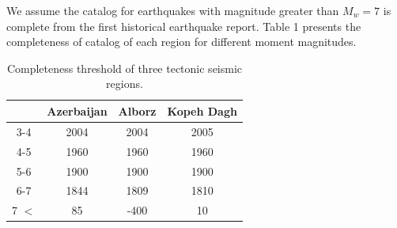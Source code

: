 We assume the catalog for earthquakes with magnitude greater than $M_w=7$ is complete from the first historical earthquake report. Table 1 presents the completeness of catalog of each region for different moment magnitudes.

\begin{table}[h]
\centering
\caption{Completeness threshold of three tectonic seismic regions.}
\begin{tabular}{cccc}
 ~           & Azerbaijan & Alborz & Kopeh Dagh \\ \hline
3-4         & 2004       & 2004   & 2005       \\ \hline
4-5         & 1960       & 1960   & 1960       \\ \hline
5-6         & 1900       & 1900   & 1900       \\ \hline
6-7         & 1844       & 1809   & 1810         \\ \hline
7 $< $    &  85          & -400    & 10         \\ \hline
\end{tabular}
\end{table}

